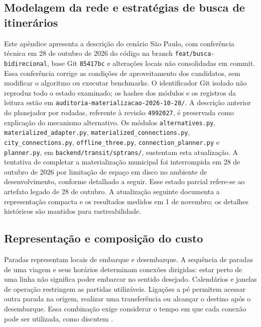 \documentclass[12pt,oneside,a4paper,brazil,chapter=TITLE]{abntex2}
\let\papsection\section
\renewcommand{\section}{\clearpage\papsection}
\begin{document}
\begin{apendicesenv}
\chapter{Modelagem da rede e estratégias de busca de itinerários}
\label{ap:rotas}
Este apêndice apresenta a descrição do cenário São Paulo, com conferência técnica em 28 de outubro de 2026 do código na branch \nolinkurl{feat/busca-bidirecional}, base Git \texttt{85417bc} e alterações locais não consolidadas em commit. Essa conferência corrige as condições de aproveitamento dos candidatos, sem modificar o algoritmo ou executar benchmarks. O identificador Git isolado não reproduz todo o estado examinado; os hashes dos módulos e os registros da leitura estão em \nolinkurl{auditoria-materializacao-2026-10-28/}. A descrição anterior do planejador por rodadas, referente à revisão \texttt{4992027}, é preservada como explicação do mecanismo alternativo. Os módulos \nolinkurl{alternatives.py}, \nolinkurl{materialized_adapter.py}, \nolinkurl{materialized_connections.py}, \nolinkurl{city_connections.py}, \nolinkurl{offline_three.py}, \nolinkurl{connection_planner.py} e \nolinkurl{planner.py}, em \nolinkurl{backend/transit/sptrans/}, sustentam esta atualização. A tentativa de completar a materialização municipal foi interrompida em 28 de outubro de 2026 por limitação de espaço em disco no ambiente de desenvolvimento, conforme detalhado a seguir. Esse estado parcial refere-se ao artefato legado de 28 de outubro. A atualização seguinte documenta a representação compacta e os resultados medidos em 1 de novembro; os detalhes históricos são mantidos para rastreabilidade.





\section{Representação e composição do custo}
Paradas representam locais de embarque e desembarque. A sequência de paradas de uma viagem e seus horários determinam conexões dirigidas: estar perto de uma linha não significa poder embarcar no sentido desejado. Calendários e janelas de operação restringem as partidas utilizáveis. Ligações a pé permitem acessar outra parada na origem, realizar uma transferência ou alcançar o destino após o desembarque. Essa combinação exige considerar o tempo em que cada conexão pode ser utilizada, como discutem \citet{bast2015}.


\end{apendicesenv}
\end{document}
